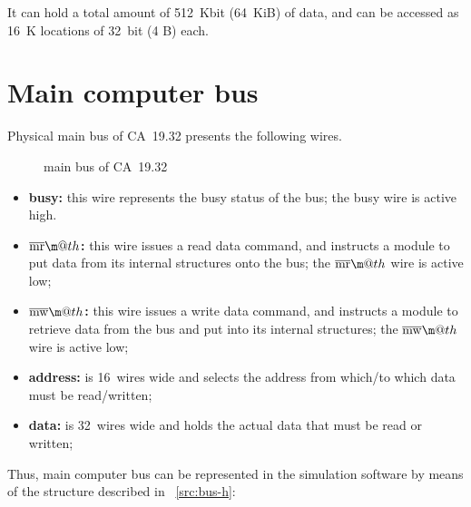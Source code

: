\documentclass[a4paper,12pt]{article}
\makeatletter
\newcommand*{\textoverline}[1]{$\overline{\hbox{#1}}\m@th$}
\newcommand{\computername}{CA~19.32}
\makeatother
\begin{document}
It can hold a total amount of 512~Kbit (64~KiB) of data, and can be accessed as 16~K locations of 32~bit (4 B) each.

\section{Main computer bus}
Physical main bus of \computername{} presents the following wires.

\begin{figure}[H]
\centering
{}
\caption{main bus of \computername{}}
\end{figure}

\begin{itemize}
  \item \textbf{busy:} this wire represents the busy status of the bus; the busy wire is active high.
  \item \textbf{\textoverline{mr}:} this wire issues a read data command, and instructs a module to put data from its internal structures onto the bus; the \textoverline{mr} wire is active low;
  \item \textbf{\textoverline{mw}:} this wire issues a write data command, and instructs a module to retrieve data from the bus and put into its internal structures; the \textoverline{mw} wire is active low;
  \item \textbf{address:} is 16~wires wide and selects the address from which/to which data must be read/written;
  \item \textbf{data:} is 32~wires wide and holds the actual data that must be read or written;
\end{itemize}

Thus, main computer bus can be represented in the simulation software by means of the structure described in \figurename~\ref{src:bus-h}:
\end{document}
